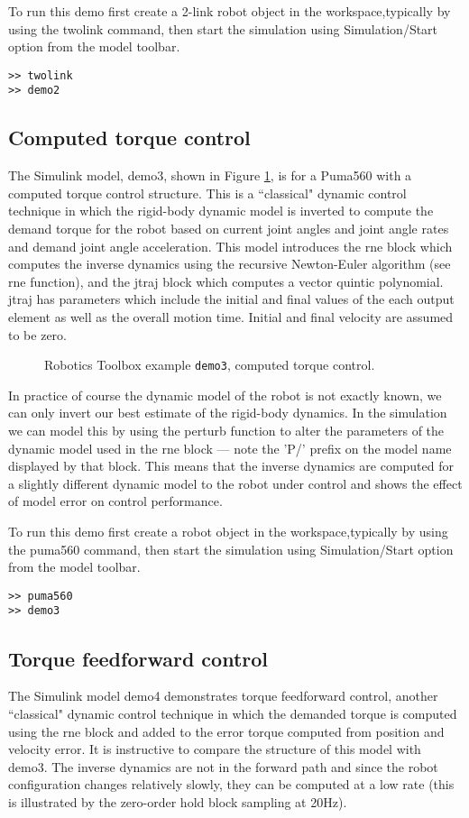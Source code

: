 \documentclass{article}
\newcommand{\var}[1]{{\vtt #1}}
\begin{document}
To run this demo first create a 2-link robot object in
the workspace,typically by using the \var{twolink} command, then start
the simulation using Simulation/Start option from the model toolbar.
\begin{verbatim}
>> twolink
>> demo2
\end{verbatim}

\subsection{Computed torque control}
The Simulink model, \var{demo3}, shown in Figure \ref{fig:demo3}, is
for a Puma560 with a computed torque control structure.
This is a ``classical"
dynamic control technique in which the rigid-body dynamic model is inverted
to compute the demand torque for the robot based on current joint angles
and joint angle rates and demand joint angle acceleration.  This model
introduces the \var{rne} block which computes the inverse dynamics using
the recursive Newton-Euler algorithm (see \var{rne} function), and the
\var{jtraj} block which computes a vector quintic polynomial.  \var{jtraj} has
parameters which include the initial and final values of the each output
element as well as the overall motion time.  Initial and final velocity are
assumed to be zero.
\begin{figure}[b]
\caption{Robotics Toolbox example \texttt{demo3}, computed torque
control.}\label{fig:demo3}
\end{figure}

In practice of course the dynamic model of the robot is not exactly known,
we can only invert our best estimate of the rigid-body dynamics.  In the
simulation we can model this by using the \var{perturb} function to alter
the parameters of the dynamic model used in the \var{rne} block --- note
the 'P/' prefix on the model name displayed by that block.
This means that the inverse dynamics are computed for a slightly different 
dynamic model to the robot under control and shows the effect of model
error on control performance.

To run this demo first create a robot object in
the workspace,typically by using the \var{puma560} command, then start
the simulation using Simulation/Start option from the model toolbar.
\begin{verbatim}
>> puma560
>> demo3
\end{verbatim}

\subsection{Torque feedforward control}
The Simulink model \var{demo4} demonstrates torque feedforward control,
another ``classical" dynamic control technique in which the demanded 
torque is computed using the
\var{rne} block and added to the error torque computed from position and
velocity error.  It is instructive to compare the structure of this
model with \var{demo3}.
The inverse dynamics are not in the forward path and since
the robot configuration changes relatively slowly, they can be computed at a
low rate (this is illustrated by the zero-order hold block sampling at 20Hz).
\end{document}
